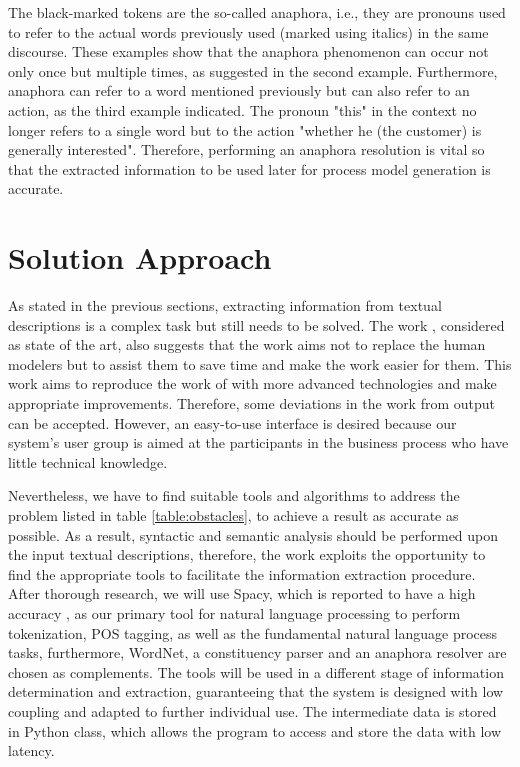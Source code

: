 The black-marked tokens are the so-called anaphora, i.e., they are pronouns used to refer to the actual words previously used (marked using italics) in the same discourse. These examples show that the anaphora phenomenon can occur not only once but multiple times, as suggested in the second example. Furthermore, anaphora can refer to a word mentioned previously but can also refer to an action, as the third example indicated. The pronoun "this" in the context no longer refers to a single word but to the action "whether he (the customer) is generally interested". Therefore, performing an anaphora resolution is vital so that the extracted information to be used later for process model generation is accurate. 

\section{Solution Approach}
As stated in the previous sections, extracting information from textual descriptions is a complex task but still needs to be solved. The work \cite{t2m_1}, considered as state of the art, also suggests that the work aims not to replace the human modelers but to assist them to save time and make the work easier for them. This work aims to reproduce the work of \cite{t2m_1} with more advanced technologies and make appropriate improvements. Therefore, some deviations in the work from output can be accepted. However, an easy-to-use interface is desired because our system's user group is aimed at the participants in the business process who have little technical knowledge. 

Nevertheless, we have to find suitable tools and algorithms to address the problem listed in table \ref{table:obstacles}, to achieve a result as accurate as possible. As a result, syntactic and semantic analysis should be performed upon the input textual descriptions, therefore, the work exploits the opportunity to find the appropriate tools to facilitate the information extraction procedure. After thorough research, we will use Spacy, which is reported to have a high accuracy \cite{complement_1}, as our primary tool for natural language processing to perform tokenization, POS tagging, as well as the fundamental natural language process tasks, furthermore, WordNet, a constituency parser and an anaphora resolver are chosen as complements. The tools will be used in a different stage of information determination and extraction, guaranteeing that the system is designed with low coupling and adapted to further individual use. The intermediate data is stored in Python class, which allows the program to access and store the data with low latency.

